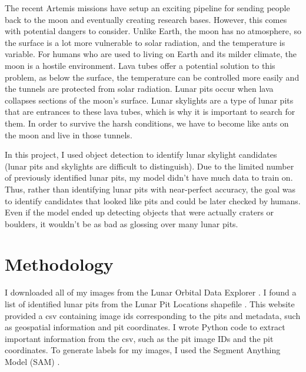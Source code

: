 \documentclass[twoside,10pt]{article}
\begin{document}
The recent Artemis missions have setup an exciting pipeline for sending people back to the moon and eventually creating research bases. However, this comes with potential dangers to consider. Unlike Earth, the moon has no atmosphere, so the surface is a lot more vulnerable to solar radiation, and the temperature is variable. For humans who are used to living on Earth and its milder climate, the moon is a hostile environment. Lava tubes offer a potential solution to this problem, as below the surface, the temperature can be controlled more easily and the tunnels are protected from solar radiation. Lunar pits occur when lava collapses sections of the moon's surface. Lunar skylights are a type of lunar pits that are entrances to these lava tubes, which is why it is important to search for them. In order to survive the harsh conditions, we have to become like ants on the moon and live in those tunnels.

In this project, I used object detection to identify lunar skylight candidates (lunar pits and skylights are difficult to distinguish). Due to the limited number of previously identified lunar pits, my model didn't have much data to train on. Thus, rather than identifying lunar pits with near-perfect accuracy, the goal was to identify candidates that looked like pits and could be later checked by humans. Even if the model ended up detecting objects that were actually craters or boulders, it wouldn't be as bad as glossing over many lunar pits.


\section{Methodology}
\fontsize{13}{15}\selectfont
I downloaded all of my images from the Lunar Orbital Data Explorer \cite{lroc_nac_data}. I found a list of identified lunar pits from the Lunar Pit Locations shapefile \cite{lroc_pit_csv}. This website provided a csv containing image ids corresponding to the pits and metadata, such as geospatial information and pit coordinates. I wrote Python code to extract important information from the csv, such as the pit image IDs and the pit coordinates. To generate labels for my images, I used the Segment Anything Model (SAM) \cite{kirillov2023segany}.
\end{document}
